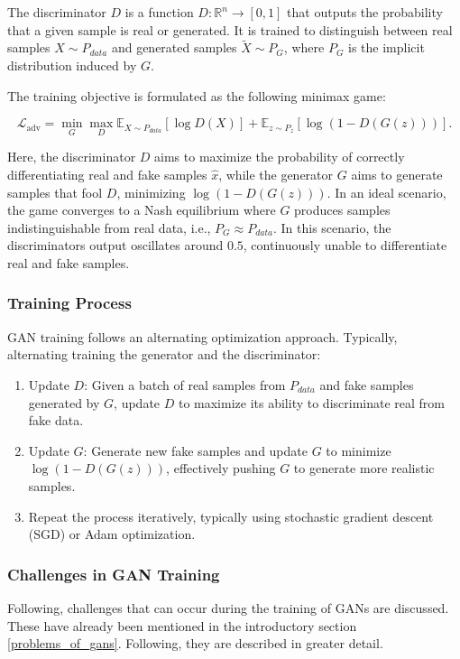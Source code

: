 The discriminator \(D\) is a function \(D: \mathbb{R}^n \to [0,1]\) that outputs the probability that a given sample is real or generated. It is trained to distinguish between real samples \(X \sim P_{data}\) and generated samples \(\tilde{X} \sim P_G\), where \(P_G\) is the implicit distribution induced by \(G\).

The training objective is formulated as the following minimax game:

    \begin{equation}\label{theory_gan_vanilla_formula}
        \mathcal{L}_{\text{adv}} = \min_G \max_D \mathbb{E}_{X \sim P_{data}} [\log D(X)] + \mathbb{E}_{z \sim P_z} [\log (1 - D(G(z)))].
    \end{equation}

Here, the discriminator \(D\) aims to maximize the probability of correctly differentiating real and fake samples \(\hat{x}\), while the generator \(G\) aims to generate samples that fool \(D\), minimizing \(\log(1 - D(G(z)))\). In an ideal scenario, the game converges to a Nash equilibrium where \(G\) produces samples indistinguishable from real data, i.e., \(P_G \approx P_{data}\). In this scenario, the discriminators output oscillates around $0.5$, continuously unable to differentiate real and fake samples.

\subsubsection{Training Process}\label{theoretical_gan_training}
GAN training follows an alternating optimization approach. Typically, alternating training the generator and the discriminator:
\begin{enumerate}
    \item Update \(D\): Given a batch of real samples from \(P_{data}\) and fake samples generated by \(G\), update \(D\) to maximize its ability to discriminate real from fake data.
    \item Update \(G\): Generate new fake samples and update \(G\) to minimize \\ \(\log(1 - D(G(z)))\), effectively pushing \(G\) to generate more realistic samples.
    \item Repeat the process iteratively, typically using stochastic gradient descent (SGD) or Adam optimization.
\end{enumerate}

\subsubsection{Challenges in GAN Training}\label{theory_gan_problems}
Following, challenges that can occur during the training of GANs are discussed. These have already been mentioned in the introductory section \ref{problems_of_gans}. Following, they are described in greater detail.

